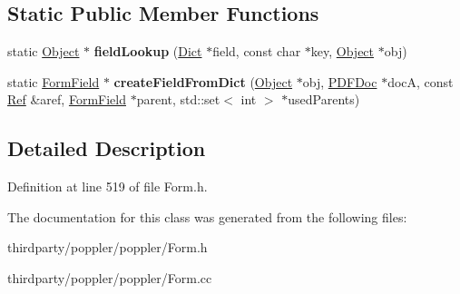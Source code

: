 \subsection*{Static Public Member Functions}
\begin{DoxyCompactItemize}
\item 
\mbox{\label{class_form_ab70295e3c158dbf1aa994a503c2c6411}} 
static \hyperlink{class_object}{Object} $\ast$ {\bfseries field\+Lookup} (\hyperlink{class_dict}{Dict} $\ast$field, const char $\ast$key, \hyperlink{class_object}{Object} $\ast$obj)
\item 
\mbox{\label{class_form_a3eb7c8508e1b0011f40cae479a252bc8}} 
static \hyperlink{class_form_field}{Form\+Field} $\ast$ {\bfseries create\+Field\+From\+Dict} (\hyperlink{class_object}{Object} $\ast$obj, \hyperlink{class_p_d_f_doc}{P\+D\+F\+Doc} $\ast$docA, const \hyperlink{struct_ref}{Ref} \&aref, \hyperlink{class_form_field}{Form\+Field} $\ast$parent, std\+::set$<$ int $>$ $\ast$used\+Parents)
\end{DoxyCompactItemize}


\subsection{Detailed Description}


Definition at line 519 of file Form.\+h.



The documentation for this class was generated from the following files\+:\begin{DoxyCompactItemize}
\item 
thirdparty/poppler/poppler/Form.\+h\item 
thirdparty/poppler/poppler/Form.\+cc\end{DoxyCompactItemize}
